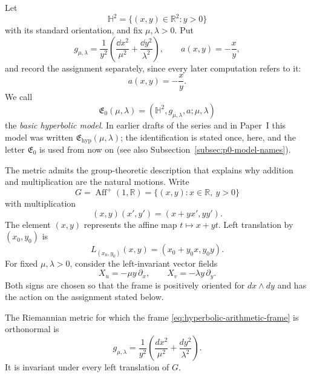 Let
\[
 \mathbb H^2=\{(x,y)\in\mathbb R^2:y>0\}
\]
with its standard orientation, and fix $\mu,\lambda>0$.  Put
\begin{equation}\label{eq:p0-e0-data}
 g_{\mu,\lambda}
 =\frac1{y^2}
  \left(\frac{\dd x^2}{\mu^2}
       +\frac{\dd y^2}{\lambda^2}\right),
 \qquad
 a(x,y)=-\frac{x}{y},
\end{equation}
and record the assignment separately, since every later computation refers to
it:
\begin{equation}\label{eq:basic-hyperbolic-assignment}
 a(x,y)=-\frac{x}{y}.
\end{equation}
We call
\[
 \mathfrak E_0(\mu,\lambda)=(\mathbb H^2,g_{\mu,\lambda},a;\mu,\lambda)
\]
the \emph{basic hyperbolic model}.  In earlier drafts of the series and in
Paper~I this model was written $\mathfrak E_{\mathrm{hyp}}(\mu,\lambda)$; the
identification is stated once, here, and the letter $\mathfrak E_0$ is used
from now on (see also Subsection~\ref{subsec:p0-model-names}).

The metric admits the group-theoretic description that explains why addition
and multiplication are the natural motions.  Write
\[
 G=\operatorname{Aff}^{+}(1,\mathbb R)
   =\{(x,y):x\in\mathbb R,\ y>0\}
\]
with multiplication
\begin{equation}\label{eq:positive-affine-group-law}
 (x,y)(x',y')=(x+yx',yy').
\end{equation}
The element $(x,y)$ represents the affine map $t\mapsto x+yt$.  Left
translation by $(x_0,y_0)$ is
\[
 L_{(x_0,y_0)}(x,y)=(x_0+y_0x,y_0y).
\]
For fixed $\mu,\lambda>0$, consider the left-invariant vector fields
\begin{equation}\label{eq:hyperbolic-arithmetic-frame}
 X_u=-\mu y\,\partial_x,
 \qquad
 X_v=-\lambda y\,\partial_y .
\end{equation}
Both signs are chosen so that the frame is positively oriented for
$dx\wedge dy$ and has the action on the assignment stated below.

\begin{proposition}\label{prop:invariant-affine-metric}
The Riemannian metric for which the frame
\eqref{eq:hyperbolic-arithmetic-frame} is orthonormal is
\begin{equation}\label{eq:hyperbolic-aes-metric}
 g_{\mu,\lambda}
 =\frac1{y^2}
  \left(\frac{dx^2}{\mu^2}+\frac{dy^2}{\lambda^2}\right).
\end{equation}
It is invariant under every left translation of $G$.
\end{proposition}

